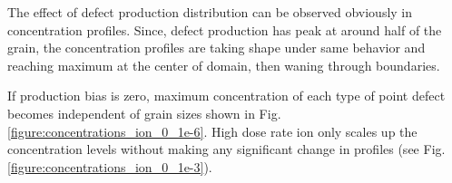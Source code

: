 \documentclass[a4paper]{article}
\begin{document}
    The effect of defect production distribution can be observed obviously in concentration profiles. Since, defect production has peak at around half of the grain, the concentration profiles are taking shape under same behavior and reaching maximum at the center of domain, then waning through boundaries.

    If production bias is zero, maximum concentration of each type of point defect becomes independent of grain sizes shown in Fig. \ref{figure:concentrations_ion_0_1e-6}. High dose rate ion only scales up the concentration levels without making any significant change in profiles (see Fig. \ref{figure:concentrations_ion_0_1e-3}).
      \begin{figure}[h!]  %
        \centering
        \qquad

\end{figure}
\end{document}
